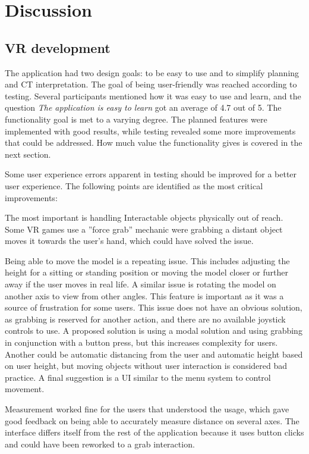 \documentclass[a4paper]{report}
\begin{document}
\section{Discussion}

\subsection{VR development}

The application had two design goals: to be easy to use and to simplify planning and CT interpretation.
The goal of being user-friendly was reached according to testing. Several participants mentioned how it was easy to use and learn, and the question \emph{The application is easy to learn} got an average of 4.7 out of 5.
The functionality goal is met to a varying degree. The planned features were implemented with good results, while testing revealed some more improvements that could be addressed. How much value the functionality gives is covered in the next section.

Some user experience errors apparent in testing should be improved for a better user experience. The following points are identified as the most critical improvements:

The most important is handling Interactable objects physically out of reach. Some VR games use a ''force grab'' mechanic were grabbing a distant object moves it towards the user's hand, which could have solved the issue.

Being able to move the model is a repeating issue. This includes adjusting the height for a sitting or standing position or moving the model closer or further away if the user moves in real life. A similar issue is rotating the model on another axis to view from other angles. This feature is important as it was a source of frustration for some users.
This issue does not have an obvious solution, as grabbing is reserved for another action, and there are no available joystick controls to use. A proposed solution is using a modal solution and using grabbing in conjunction with a button press, but this increases complexity for users. Another could be automatic distancing from the user and automatic height based on user height, but moving objects without user interaction is considered bad practice. A final suggestion is a UI similar to the menu system to control movement.

Measurement worked fine for the users that understood the usage, which gave good feedback on being able to accurately measure distance on several axes. The interface differs itself from the rest of the application because it uses button clicks and could have been reworked to a grab interaction.
\end{document}
